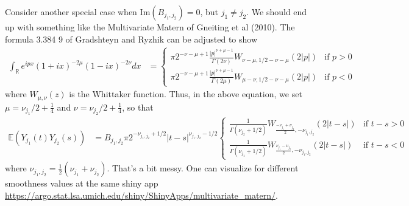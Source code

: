 \documentclass[11pt]{article}
\begin{document}



Consider another special case when $\textrm{Im}(B_{j_1, j_2})=0$, but $j_1 \neq j_2$. We should end up with something like the Multivariate Matern of Gneiting et al (2010). The formula 3.384 9 of Gradshteyn and Ryzhik can be adjusted to show \begin{align*}
\int_{\mathbb{R}}e^{ipx}(1 + ix)^{-2\mu}(1 -ix)^{-2\nu} dx &= \begin{cases}\pi 2^{-\nu-\mu+1} \frac{|p|^{\nu+\mu-1}}{\Gamma(2 \nu)} W_{\nu - \mu, 1/2 - \nu- \mu}(2|p|) & \textrm{if } p > 0 \\
\pi 2^{-\nu-\mu+1} \frac{|p|^{\nu+\mu-1}}{\Gamma(2 \mu)} W_{\mu - \nu, 1/2 - \nu- \mu}(2|p|)&\textrm{if } p< 0 \end{cases}
\end{align*}where $W_{\mu, \nu}(z)$ is the Whittaker function. Thus, in the above equation, we set $\mu = \nu_{j_1}/2 + \frac{1}{4} $ and $\nu = \nu_{j_2}/2 + \frac{1}{4}$, so that \begin{align*}
\mathbb{E}(Y_{j_1}(t)Y_{j_2}(s)) &= B_{j_1, j_2} \pi 2^{-\nu_{j_1, j_2} + 1/2} |t-s|^{\nu_{j_1, j_2}-  1/2}\begin{cases}
\frac{1}{\Gamma( \nu_{j_2}+ 1/2 )}W_{\frac{-\nu_{j_1} + \nu_{j_2}}{2}, -\nu_{j_1, j_2}}(2|t-s|)&\textrm{if } t-s> 0\\
\frac{1}{\Gamma( \nu_{j_1}+ 1/2)}W_{\frac{\nu_{j_1} - \nu_{j_2}}{2},- \nu_{j_1, j_2}}(2|t-s|)&\textrm{if } t-s< 0
\end{cases}%
\end{align*}where $\nu_{j_1, j_2} = \frac{1}{2}\left(\nu_{j_1}+\nu_{j_2}\right)$. That's a bit messy. One can visualize for different smoothness values at the same shiny app \url{https://argo.stat.lsa.umich.edu/shiny/ShinyApps/multivariate_matern/}.
\end{document}
